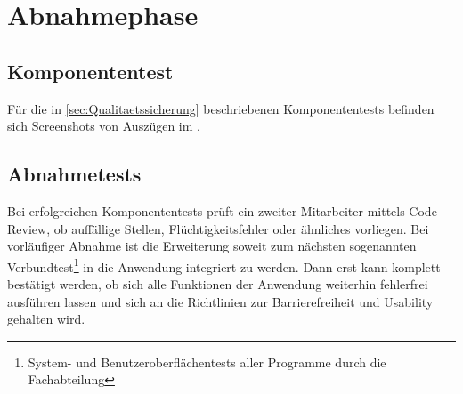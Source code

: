 \section{Abnahmephase} 
\label{sec:Abnahmephase}

\subsection{Komponententest}

Für die in \ref{sec:Qualitaetssicherung} beschriebenen Komponententests befinden sich Screenshots von Auszügen im .

\subsection{Abnahmetests}

Bei erfolgreichen Komponententests prüft ein zweiter Mitarbeiter mittels Code-Review, ob auffällige Stellen, Flüchtigkeitsfehler oder ähnliches vorliegen. Bei vorläufiger Abnahme ist die Erweiterung soweit zum nächsten sogenannten Verbundtest\footnote{System- und Benutzeroberflächentests aller Programme durch die Fachabteilung} in die Anwendung integriert zu werden. Dann erst kann komplett bestätigt werden, ob sich alle Funktionen der Anwendung weiterhin fehlerfrei ausführen lassen und sich an die Richtlinien zur Barrierefreiheit und Usability gehalten wird.

